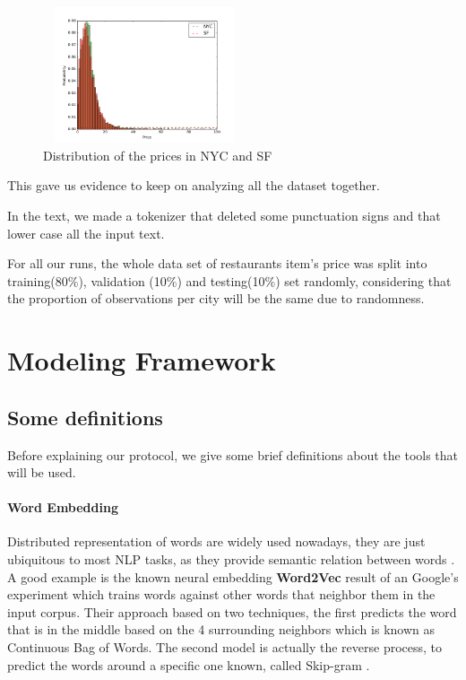 \documentclass[11pt,letterpaper]{article}
\begin{document}
   \begin{figure}[thpb]
      \centering
      \includegraphics[width=6cm, height=4cm]{dist_sf_nyc_prices}
      \caption{Distribution of the prices in NYC and SF}
      \label{fig:price_dist}
   \end{figure}

This gave us evidence to keep on analyzing all the dataset together. 

In the text, we made a tokenizer that deleted some punctuation signs and that lower case all the input text.

For all our runs, the whole data set of restaurants item's price was split into training(80\%), validation (10\%) and testing(10\%) set randomly, considering that the proportion of observations per city will be the same due to randomness. 

\section{Modeling Framework}
\subsection{Some definitions}
Before explaining our protocol, we give some brief definitions about the tools that will be used.
\paragraph{Word Embedding}
Distributed representation of words are widely used nowadays, they are just ubiquitous to most NLP tasks, as they provide semantic relation between words \cite{hill2016learning}.  A good example is the known neural embedding \textbf{Word2Vec} result of an Google's experiment which trains words against other words that neighbor them in the input corpus. Their approach based on two techniques, the first predicts the word that is in the middle based on the 4 surrounding neighbors which is known as Continuous Bag of Words. The second model is actually the reverse process, to predict the words around a specific one known, called Skip-gram \cite{mikolov2013distributed,mikolov2013efficient}. 
\end{document}
